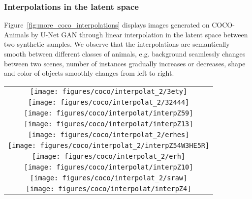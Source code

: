 \documentclass[10pt,twocolumn,letterpaper]{article}
\begin{document}
\subsubsection*{Interpolations in the latent space}

Figure~\ref{fig:more_coco_interpolations} displays images generated on COCO-Animals by U-Net GAN through linear interpolation in the latent space between two synthetic samples. 
We observe that the interpolations are semantically smooth between different classes of animals, e.g. background seamlessly changes between two scenes, number of instances gradually increases or decreases, shape and color of objects smoothly changes from left to right. 

\begin{figure*}
\begin{centering}
\setlength{\tabcolsep}{0.1em}
\renewcommand{\arraystretch}{1.0}
\par\end{centering}
\begin{centering}

\begin{tabular}{@{}c@{}}


\texttt{[image: figures/coco/interpolat\_2/3ety]}\tabularnewline



\texttt{[image: figures/coco/interpolat\_2/32444]}\tabularnewline


\texttt{[image: figures/coco/interpolat/interpZ59]}\tabularnewline

\texttt{[image: figures/coco/interpolat/interpZ13]}\tabularnewline



\texttt{[image: figures/coco/interpolat\_2/erhes]}\tabularnewline

\texttt{[image: figures/coco/interpolat\_2/interpZ54W3HE5R]}\tabularnewline


\texttt{[image: figures/coco/interpolat\_2/erh]}\tabularnewline


\texttt{[image: figures/coco/interpolat/interpZ10]}\tabularnewline

\texttt{[image: figures/coco/interpolat\_2/sraw]}\tabularnewline


\texttt{[image: figures/coco/interpolat/interpZ4]}\tabularnewline

\end{tabular}
\par\end{centering}
\caption{\label{fig:more_coco_interpolations} Images generated with U-Net GAN on COCO-Animals with resolution $128 \times 128$ when interpolating in the latent space between two synthetic samples (left to right).} 
\vspace{0em}
\end{figure*}
 
\end{document}
